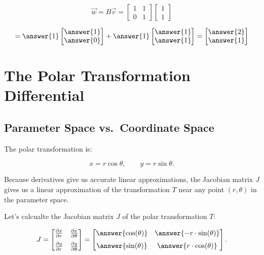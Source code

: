 \documentclass{ximera}
\begin{document}
\begin{problem}
\begin{enumerate}
    $$\vec{w} = B\vec{v}= \begin{bmatrix}1 & 1 \\ 0 & 1\end{bmatrix}\begin{bmatrix}1 \\ 1\end{bmatrix}$$

    $$=\answer{1}\begin{bmatrix}
      \answer{1} \\ \answer{0}
    \end{bmatrix} + \answer{1}\begin{bmatrix}
      \answer{1} \\ \answer{1}
    \end{bmatrix} = \begin{bmatrix}
      \answer{2} \\ \answer{1}
    \end{bmatrix}$$
  \end{enumerate}
\end{problem}

\section*{The Polar Transformation Differential}

\subsection*{Parameter Space vs.\ Coordinate Space}

The polar transformation is:

\[
  x = r\cos\theta, \qquad y = r\sin\theta.
\]

Because derivatives give us accurate linear approximations, the Jacobian matrix $J$ gives us a linear approximation of the transformation $T$ near any point $(r,\theta)$ in the parameter space.

\begin{problem}
Let's calcualte the Jacobian matrix $J$ of the polar transformation $T$:

\[
  J = \begin{bmatrix}
    \frac{\partial x}{\partial r} & \frac{\partial x}{\partial \theta} \\[6pt]
    \frac{\partial y}{\partial r} & \frac{\partial y}{\partial \theta}
  \end{bmatrix}
  = \begin{bmatrix}
    \answer{\cos(\theta)} & \answer{-r\cdot\sin(\theta)} \\[6pt]
    \answer{\sin(\theta)} & \answer{r\cdot \cos(\theta)}
  \end{bmatrix}.
\]
\end{problem}
\end{document}
